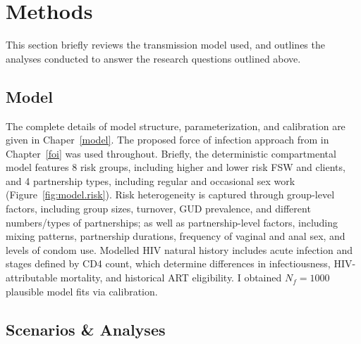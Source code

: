 \section{Methods}\label{art.meth}
This section briefly reviews the transmission model used,
and outlines the analyses conducted to answer the research questions outlined above.
\subsection{Model}\label{art.meth.model}
The complete details of model structure, parameterization, and calibration
are given in Chaper~\ref{model}.
The proposed force of infection approach from in Chapter~\ref{foi} was used throughout.
Briefly, the deterministic compartmental model features
8 risk groups, including higher and lower risk FSW and clients, and
4 partnership types, including regular and occasional sex work (Figure~\ref{fig:model.risk}).
Risk heterogeneity is captured through group-level factors, including
group sizes, turnover, GUD prevalence, and different numbers/types of partnerships;
as well as partnership-level factors, including
mixing patterns, partnership durations, frequency of vaginal and anal sex, and levels of condom use.
Modelled HIV natural history includes acute infection and stages defined by CD4 count, which
determine differences in infectiousness, HIV-attributable mortality, and historical ART eligibility.
I obtained $N_f = 1000$ plausible model fits via calibration.
\subsection{Scenarios \& Analyses}\label{art.meth.obj}
